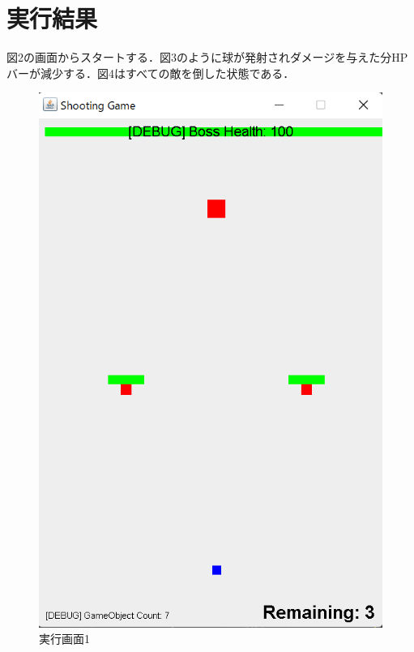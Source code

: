 \documentclass[dvipdfmx]{jlreq}
\begin{document}
\section{実行結果}
図2の画面からスタートする．図3のように球が発射されダメージを与えた分HPバーが減少する．図4はすべての敵を倒した状態である．
\begin{figure}[H]
\centering
\begin{minipage}[b]{0.32\columnwidth}
    \centering
    \includegraphics[width=0.7\columnwidth]{figures/result1.png}
    \caption{実行画面1}
    \label{fig:a}
\end{minipage}
\begin{minipage}[b]{0.32\columnwidth}
    \centering

\end{minipage}
\end{figure}
\end{document}
